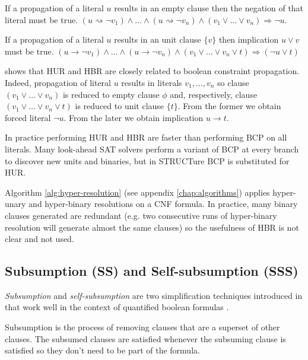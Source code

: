 \begin{myprop}
  If a propagation of a literal $u$ results in an empty clause then
  the negation of that literal must be true.
  $(u \rightsquigarrow \neg v_1) \land \ldots
  \land (u \rightsquigarrow \neg v_n) \land (v_1 \lor \dots \lor v_n)
  \Rightarrow \neg u$. 
\end{myprop}

\begin{myprop}
  If a propagation of a literal $u$ results in an unit clause $\{ v \}$
  then implication $u \lor v$ must be true.
  $(u \rightarrow \neg v_1) \land \ldots
  \land (u \rightarrow \neg v_n)
  \land (v_1 \lor \dots \lor v_n \lor t) \Rightarrow (\neg u \lor t)$
\end{myprop}

\cite{Bacchus03effectivepreprocessing} shows that HUR and HBR
are closely related to boolean constraint propagation.  Indeed,
propagation of literal $u$ results in literals $v_1, \ldots, v_n$
so clause $(v_1 \lor \dots \lor v_n)$ is reduced to empty clause
$\phi$ and, respectively, clause $(v_1 \lor \dots \lor v_n \lor
t)$ is reduced to unit clause $\{ t \}$. From the former we obtain
forced literal $\neg u$. From the later we obtain implication $u
\rightarrow t$.

In practice performing HUR and HBR are faster than performing BCP on
all literals. Many look-ahead SAT solvers perform a variant of BCP
\cite{Freeman:1995:IPS:220639} at every branch to discover new units
and binaries, but in STRUCTure BCP is substituted for HUR.

Algorithm \ref{alg:hyper-resolution} (see appendix
\ref{chap:algorithms}) applies hyper-unary and hyper-binary
resolutions on a CNF formula. In practice, many binary clauses
generated are redundant (e.g. two consecutive runs of hyper-binary
resolution will generate almost the same clauses) so the usefulness
of HBR is not clear and not used.


\subsection{Subsumption (SS) and Self-subsumption (SSS)}
\label{ssec:sss}

\emph{Subsumption} and \emph{self-subsumption} are two simplification
techniques introduced in \cite{Een05effectivepreprocessing}
that work well in the context of quantified boolean formulas
\cite{Biere04resolveand}.

Subsumption is the process of removing clauses that are a superset
of other clauses. The subsumed clauses are satisfied whenever
the subsuming clause is satisfied so they don't need to be part of
the formula.


